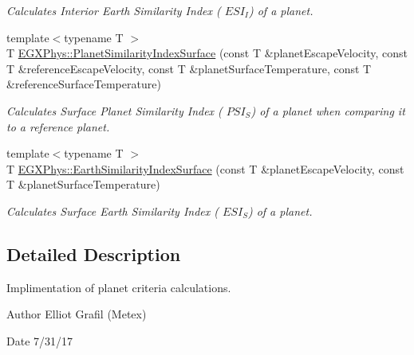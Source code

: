 \begin{DoxyCompactItemize}
\begin{DoxyCompactList}\small\item\em Calculates Interior Earth Similarity Index ( $ESI_I$) of a planet. \end{DoxyCompactList}\item 
{\footnotesize template$<$typename T $>$ }\\T \hyperlink{group___astrophysics_gae0c7dce2779d66b0560ca388a34ddc39}{E\+G\+X\+Phys\+::\+Planet\+Similarity\+Index\+Surface} (const T \&planet\+Escape\+Velocity, const T \&reference\+Escape\+Velocity, const T \&planet\+Surface\+Temperature, const T \&reference\+Surface\+Temperature)
\begin{DoxyCompactList}\small\item\em Calculates Surface Planet Similarity Index ( $PSI_S$) of a planet when comparing it to a reference planet. \end{DoxyCompactList}\item 
{\footnotesize template$<$typename T $>$ }\\T \hyperlink{group___astrophysics_ga1df772b0ed354ca7f7e4a7a4af072325}{E\+G\+X\+Phys\+::\+Earth\+Similarity\+Index\+Surface} (const T \&planet\+Escape\+Velocity, const T \&planet\+Surface\+Temperature)
\begin{DoxyCompactList}\small\item\em Calculates Surface Earth Similarity Index ( $ESI_S$) of a planet. \end{DoxyCompactList}\end{DoxyCompactItemize}


\subsection{Detailed Description}
Implimentation of planet criteria calculations. 

\begin{DoxyAuthor}{Author}
Elliot Grafil (Metex) 
\end{DoxyAuthor}
\begin{DoxyDate}{Date}
7/31/17 
\end{DoxyDate}
